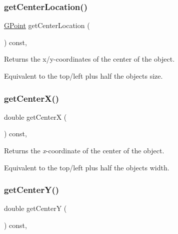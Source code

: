 \mbox{\label{classsgl_1_1GObject_a0909472e91448470bccdb62ecfb95d8b}} 
\subsubsection{\texorpdfstring{get\+Center\+Location()}{getCenterLocation()}}
{\footnotesize\ttfamily \mbox{\hyperlink{structsgl_1_1GPoint}{G\+Point}} get\+Center\+Location (\begin{DoxyParamCaption}{ }\end{DoxyParamCaption}) const\hspace{0.3cm}{\ttfamily [virtual]}, {\ttfamily [inherited]}}



Returns the x/y-\/coordinates of the center of the object. 

Equivalent to the top/left plus half the object\textquotesingle{}s size. \mbox{\label{classsgl_1_1GObject_a04df74355b545e0543112d5b8d924176}} 
\subsubsection{\texorpdfstring{get\+Center\+X()}{getCenterX()}}
{\footnotesize\ttfamily double get\+CenterX (\begin{DoxyParamCaption}{ }\end{DoxyParamCaption}) const\hspace{0.3cm}{\ttfamily [virtual]}, {\ttfamily [inherited]}}



Returns the {\itshape x}-\/coordinate of the center of the object. 

Equivalent to the top/left plus half the object\textquotesingle{}s width. \mbox{\label{classsgl_1_1GObject_acb3287a3d507025a26f54b895713b947}} 
\subsubsection{\texorpdfstring{get\+Center\+Y()}{getCenterY()}}
{\footnotesize\ttfamily double get\+CenterY (\begin{DoxyParamCaption}{ }\end{DoxyParamCaption}) const\hspace{0.3cm}{\ttfamily [virtual]}, {\ttfamily [inherited]}}




